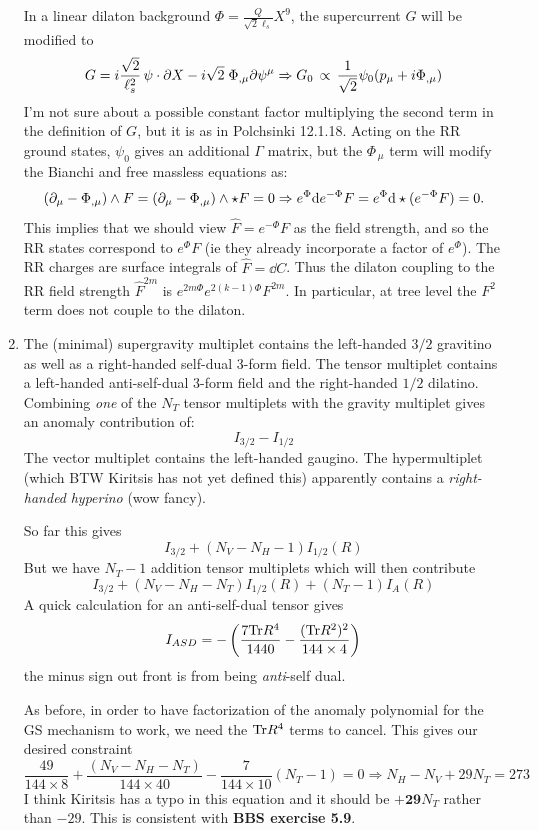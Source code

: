 \documentclass[11pt, class=article, crop=false]{standalone}
\begin{document}
\begin{enumerate}
	In a linear dilaton background $\Phi = \frac{Q}{\sqrt{2} \ell_s} X^9$, the supercurrent $G$ will be modified to
	\[
		G= i \frac{\sqrt 2}{\ell_s^2}\,\psi \cdot \partial X  - i \sqrt 2\;  \Phi_{,\mu} \partial \psi^\mu \Rightarrow G_0 \, \propto \, \frac{1}{\sqrt 2} \psi_0 (p_\mu + i \Phi_{, \mu})
	\]
	I'm not sure about a possible constant factor multiplying the second term in the definition of $G$, but it is as in Polchsinki 12.1.18. Acting on the RR ground states, $\psi_0$ gives an additional $\Gamma$ matrix, but the $\Phi_{\, \mu}$ term will modify the Bianchi and free massless equations as:
	\[
		(\partial_\mu -\Phi_{, \mu}) \wedge F = (\partial_\mu - \Phi_{, \mu}) \wedge \star F = 0 \Rightarrow e^{\Phi} \mathrm{d} e^{-\Phi} F = e^{\Phi} \mathrm{d} \star (e^{-\Phi} F) = 0.
	\]
	This implies that we should view $\hat F = e^{-\Phi} F$ as the field strength, and so the RR states correspond to $e^{\Phi} F$ (ie they already incorporate a factor of $e^{\Phi}$). The RR charges are surface integrals of $\hat F = \dd C$. Thus the dilaton coupling to the RR field strength $\hat F^{2m}$ is $e^{2m \Phi} e^{2 (k -1) \Phi} F^{2m}$. In particular, at tree level the $F^2$ term does not couple to the dilaton.
	
	\item The (minimal) supergravity multiplet contains  the left-handed $3/2$ gravitino as well as a right-handed self-dual 3-form field. The tensor multiplet contains a left-handed anti-self-dual 3-form field and the right-handed $1/2$ dilatino. Combining \emph{one} of the $N_T$ tensor multiplets with the gravity multiplet gives an anomaly contribution of:
	\[
		I_{3/2} - I_{1/2}
	\]
	The vector multiplet contains the left-handed gaugino. The hypermultiplet (which BTW Kiritsis has not yet defined this) apparently contains a \emph{right-handed} \emph{hyperino} (wow fancy). 
	
	So far this gives
	\[
		I_{3/2} + (N_V - N_H - 1) I_{1/2} (R)
	\]
	But we have $N_T - 1$ addition tensor multiplets which will then contribute
	\[
		I_{3/2} + (N_V - N_H - N_T) I_{1/2} (R) + (N_T - 1) I_A(R) 
	\]
	A quick calculation for an anti-self-dual tensor gives
	\[
		I_{ASD} = - \left( \frac{7 \mathrm{Tr} R^4}{1440} - \frac{(\mathrm{Tr} R^2)^2}{144 \times 4} \right)
	\]
	the minus sign out front is from being \emph{anti}-self dual. 
	
	As before, in order to have factorization of the anomaly polynomial for the GS mechanism to work, we need the $\mathrm{Tr} R^4$ terms to cancel. This gives our desired constraint
	\[
		\frac{49}{144 \times 8} + \frac{(N_V - N_H - N_T)}{144 \times 40} - \frac{7}{144 \times 10} (N_T- 1) = 0 \Rightarrow N_H - N_V + 29 N_T = 273
	\]
	I think Kiritsis has a typo in this equation and it should be $\mathbf{+29} N_T$ rather than $-29$. This is consistent with \textbf{BBS exercise 5.9}.
	

\end{enumerate}
\end{document}
